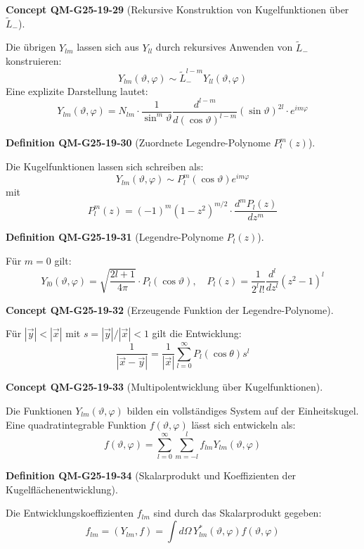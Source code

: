 \documentclass[10pt, letterpaper]{article}
\newcommand{\CustomHeading}[3]{%
  \par\medskip\noindent%
  \textbf{#1 #2} \textnormal{(#3)}.\enskip%
}
\newenvironment{DEF}[2]{\CustomHeading{Definition}{#1}{#2}}{}
\newenvironment{CONC}[2]{\CustomHeading{Concept}{#1}{#2}}{}
\begin{document}
\begin{CONC}{QM-G25-19-29}{Rekursive Konstruktion von Kugelfunktionen über \(\tilde{L}_-\)}
Die übrigen \(Y_{lm}\) lassen sich aus \(Y_{ll}\) durch rekursives Anwenden von \(\tilde{L}_-\) konstruieren:
$$
Y_{lm}(\vartheta, \varphi) \sim \tilde{L}_-^{l-m} Y_{ll}(\vartheta, \varphi)
$$
Eine explizite Darstellung lautet:
$$
Y_{lm}(\vartheta, \varphi) = N_{lm} \cdot \frac{1}{\sin^m \vartheta} \frac{d^{l - m}}{d (\cos \vartheta)^{l - m}} (\sin \vartheta)^{2l} \cdot e^{i m \varphi}
$$
\end{CONC}

\begin{DEF}{QM-G25-19-30}{Zuordnete Legendre-Polynome \(P_l^m(z)\)}
Die Kugelfunktionen lassen sich schreiben als:
$$
Y_{lm}(\vartheta, \varphi) \sim P_l^m(\cos \vartheta) e^{i m \varphi}
$$
mit
$$
P_l^m(z) = (-1)^m (1 - z^2)^{m/2} \cdot \frac{d^m P_l(z)}{dz^m}
$$
\end{DEF}

\begin{DEF}{QM-G25-19-31}{Legendre-Polynome \(P_l(z)\)}
Für \(m = 0\) gilt:
$$
Y_{l0}(\vartheta, \varphi) = \sqrt{\frac{2l+1}{4\pi}} \cdot P_l(\cos \vartheta), \quad
P_l(z) = \frac{1}{2^l l!} \frac{d^l}{dz^l}(z^2 - 1)^l
$$
\end{DEF}

\begin{CONC}{QM-G25-19-32}{Erzeugende Funktion der Legendre-Polynome}
Für \(|\vec{y}| < |\vec{x}|\) mit \(s = |\vec{y}| / |\vec{x}| < 1\) gilt die Entwicklung:
$$
\frac{1}{|\vec{x} - \vec{y}|} = \frac{1}{|\vec{x}|} \sum_{l=0}^{\infty} P_l(\cos \theta) s^l
$$
\end{CONC}

\begin{CONC}{QM-G25-19-33}{Multipolentwicklung über Kugelfunktionen}
Die Funktionen \(Y_{lm}(\vartheta, \varphi)\) bilden ein vollständiges System auf der Einheitskugel. Eine quadratintegrable Funktion \(f(\vartheta, \varphi)\) lässt sich entwickeln als:
$$
f(\vartheta, \varphi) = \sum_{l=0}^{\infty} \sum_{m=-l}^{l} f_{lm} Y_{lm}(\vartheta, \varphi)
$$
\end{CONC}

\begin{DEF}{QM-G25-19-34}{Skalarprodukt und Koeffizienten der Kugelflächenentwicklung}
Die Entwicklungskoeffizienten \(f_{lm}\) sind durch das Skalarprodukt gegeben:
$$
f_{lm} = \left(Y_{lm}, f\right) = \int d\Omega \, Y_{lm}^*(\vartheta, \varphi) f(\vartheta, \varphi)
$$
\end{DEF}
\end{document}
